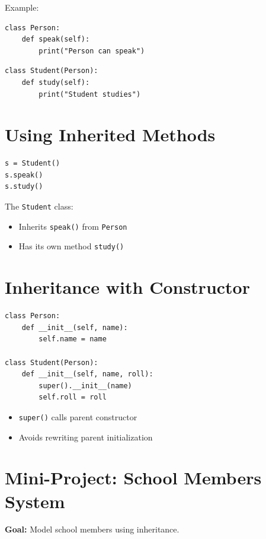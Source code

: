 Example:

\begin{verbatim}
class Person:
    def speak(self):
        print("Person can speak")
\end{verbatim}

\begin{verbatim}
class Student(Person):
    def study(self):
        print("Student studies")
\end{verbatim}

\section{Using Inherited Methods}

\begin{verbatim}
s = Student()
s.speak()
s.study()
\end{verbatim}

The \texttt{Student} class:
\begin{itemize}
    \item Inherits \texttt{speak()} from \texttt{Person}
    \item Has its own method \texttt{study()}
\end{itemize}

\section{Inheritance with Constructor}

\begin{verbatim}
class Person:
    def __init__(self, name):
        self.name = name

class Student(Person):
    def __init__(self, name, roll):
        super().__init__(name)
        self.roll = roll
\end{verbatim}

\begin{itemize}
    \item \texttt{super()} calls parent constructor
    \item Avoids rewriting parent initialization
\end{itemize}

\section{Mini-Project: School Members System}

\textbf{Goal:} Model school members using inheritance.

